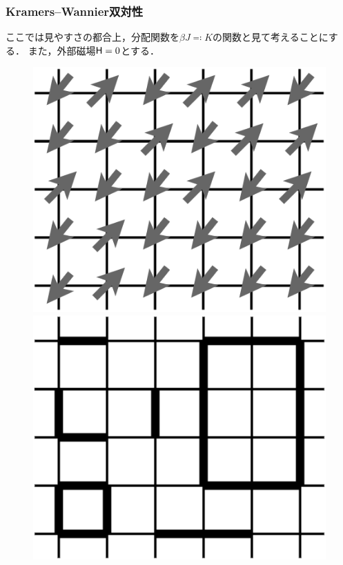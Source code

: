 	\subsubsection{Kramers--Wannier双対性}
	
	ここでは見やすさの都合上，分配関数を$\beta J \eqqcolon K$の関数と見て考えることにする．
	また，外部磁場$\mathsf{H} = 0$とする．
\begin{figure}[thbp]
		\begin{minipage}[t]{0.32\linewidth}
				\centering
				\includegraphics[keepaspectratio, scale=0.3]{./doc/img/KW_duality.png}
		\end{minipage}
		\begin{minipage}[t]{0.32\linewidth}
				\centering
				\includegraphics[keepaspectratio, scale=0.3]{./doc/img/KW_duality-Page-2.drawio.png}

\end{minipage}
\end{figure}
